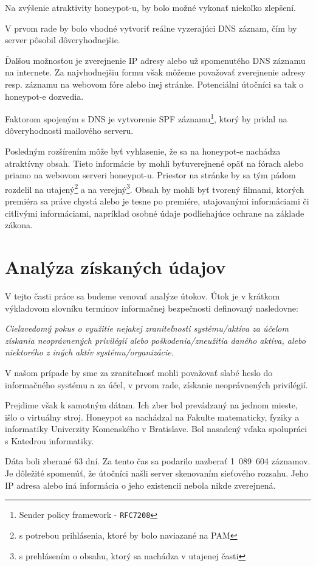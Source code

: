\documentclass[12pt, oneside]{book}
\begin{document}
Na zvýšenie atraktivity honeypot-u, by bolo možné vykonať niekoľko zlepšení.

V prvom rade by bolo vhodné vytvoriť reálne vyzerajúci DNS záznam, čím by server pôsobil dôveryhodnejšie.

Ďalšou možnosťou je zverejnenie IP adresy alebo už spomenutého DNS záznamu na internete.
Za najvhodnejšiu formu však môžeme považovať zverejnenie adresy resp. záznamu na webovom fóre alebo inej stránke.
Potenciálni útočníci sa tak o honeypot-e dozvedia.

Faktorom spojeným s DNS je vytvorenie SPF záznamu\footnote{Sender policy framework - \texttt{RFC7208}}, ktorý by pridal na dôveryhodnosti mailového serveru.

Posledným rozšírením môže byť vyhlasenie, že sa na honeypot-e nachádza a\-trak\-tí\-vny obsah.
Tieto informácie by mohli byťuverejnené opäť na fórach alebo priamo na webovom serveri honeypot-u.
Priestor na stránke by sa tým pádom rozdelil na utajený\footnote{s potrebou prihlásenia, ktoré by bolo naviazané na PAM} a na verejný\footnote{s prehlásením o obsahu, ktorý sa nachádza v utajenej časti}.
Obsah by mohli byť tvorený filmami, ktorých premiéra sa práve chystá alebo je tesne po premiére, utajovanými informáciami či citlivými informáciami, napríklad osobné údaje podliehajúce ochrane na základe zákona.


\chapter{Analýza získaných údajov}

V tejto časti práce sa budeme venovať analýze útokov.
Útok je v krátkom výkladovom slovníku termínov informačnej bezpečnosti definovaný nasledovne\cite{ksib}:

\textit{Cieľavedomý pokus o využitie nejakej zraniteľnosti systému/aktíva za účelom získania neoprávnených privilégií alebo poškodenia/zneužitia daného aktíva, alebo niektorého z iných aktív systému/organizácie.}

V našom prípade by sme za zraniteľnosť mohli považovať slabé heslo do informačného systému a za účel, v prvom rade, získanie neoprávnených privilégií.

Prejdime však k samotným dátam.
Ich zber bol prevádzaný na jednom mieste, išlo o virtuálny stroj.
Honeypot sa nachádzal na Fakulte matematicky, fyziky a informatiky Univerzity Komenského v Bratislave.
Bol nasadený vďaka spolupráci s Katedrou informatiky.

Dáta boli zberané 63 dní. Za tento čas sa podarilo nazberať 1~089~604 záznamov.
Je dôležité spomenúť, že útočníci našli server skenovaním sieťového rozsahu. Jeho IP adresa alebo iná informácia o jeho existencii nebola nikde zverejnená.
\end{document}
